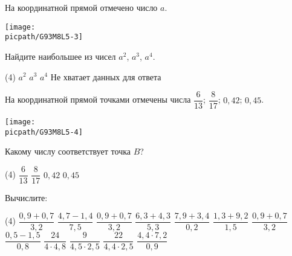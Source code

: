 \begin{class}[number=5]
\begin{listofex}
\begin{tasks}
		\end{tasks}
		\item На координатной прямой отмечено число \( a \).
		\begin{center}
			\texttt{[image: \\picpath/G93M8L5-3]}
		\end{center}
		Найдите наибольшее из чисел \( a^2 \), \( a^3 \), \( a^4 \).
		\begin{tasks}(4)
			\task \( a^2 \)
			\task \( a^3 \)
			\task \( a^4 \)
			\task Не хватает данных для ответа
		\end{tasks}
		\item На координатной прямой точками отмечены числа \( \dfrac{6}{13} \); \( \dfrac{8}{17} \); \( 0,42 \); \( 0,45 \).
		\begin{center}
			\texttt{[image: \\picpath/G93M8L5-4]}
		\end{center}
		Какому числу соответствует точка \( B \)?
		\begin{tasks}(4)
			\task \( \dfrac{6}{13} \)
			\task \( \dfrac{8}{17} \)
			\task \( 0,42 \)
			\task \( 0,45 \)
		\end{tasks}
		\item Вычислите:
		\begin{tasks}(4)
			\task \( \dfrac{0,9+0,7}{3,2} \)
			\task \( \dfrac{4,7-1,4}{7,5} \)
			\task \( \dfrac{0,9+0,7}{3,2} \)
			\task \( \dfrac{6,3+4,3}{5,3} \)
			\task \( \dfrac{7,9+3,4}{0,2} \)
			\task \( \dfrac{1,3+9,2}{1,5} \)
			\task \( \dfrac{0,9+0,7}{3,2} \)
			\task \( \dfrac{0,5-1,5}{0,8} \)
			\task \( \dfrac{24}{4\cdot4,8} \)
			\task \( \dfrac{9}{4,5\cdot2,5} \)
			\task \( \dfrac{22}{4,4\cdot2,5} \)
			\task \( \dfrac{4,4\cdot7,2}{0,9} \)
		\end{tasks}
	\end{listofex}
\end{class}

